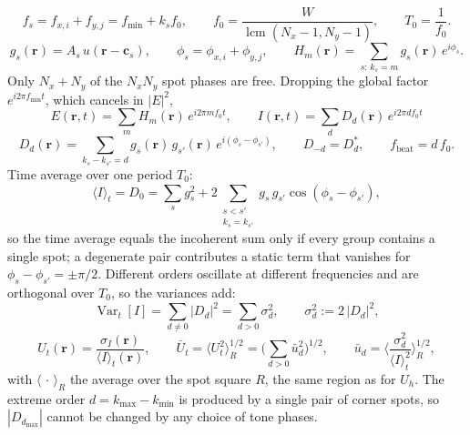 \begin{equation}
f_s=f_{x,i}+f_{y,j}=f_{\min}+k_sf_0,
\qquad
f_0=\frac{W}{\operatorname{lcm}(N_x-1,N_y-1)},
\qquad
T_0=\frac{1}{f_0} .
\end{equation}
\begin{equation}
g_s(\mathbf{r})=A_s\,u(\mathbf{r}-\mathbf{c}_s),
\qquad
\phi_s=\phi_{x,i}+\phi_{y,j},
\qquad
H_m(\mathbf{r})=\sum_{s:\,k_s=m}g_s(\mathbf{r})\,e^{i\phi_s} .
\end{equation}
Only $N_x+N_y$ of the $N_xN_y$ spot phases are free. Dropping the global factor
$e^{i2\pi f_{\min}t}$, which cancels in $|E|^2$,
\begin{equation}
\boxed{\;
E(\mathbf{r},t)=\sum_m H_m(\mathbf{r})\,e^{i2\pi mf_0t},
\qquad
I(\mathbf{r},t)=\sum_d D_d(\mathbf{r})\,e^{i2\pi df_0t}\;}
\label{eq:app_fourier}
\end{equation}
\begin{equation}
D_d(\mathbf{r})=\!\!\sum_{k_s-k_{s'}=d}\!\!
g_s(\mathbf{r})\,g_{s'}(\mathbf{r})\,e^{i(\phi_s-\phi_{s'})},
\qquad
D_{-d}=D_d^{*},
\qquad
f_\mathrm{beat}=d\,f_0 .
\end{equation}
Time average over one period $T_0$:
\begin{equation}
\langle I\rangle_t=D_0
=\sum_s g_s^2
+2\!\!\sum_{\substack{s<s'\\ k_s=k_{s'}}}\!\! g_s\,g_{s'}\cos(\phi_s-\phi_{s'}),
\label{eq:app_timeavg}
\end{equation}
so the time average equals the incoherent sum only if every group contains a
single spot; a degenerate pair contributes a static term that vanishes for
$\phi_s-\phi_{s'}=\pm\pi/2$. Different orders oscillate at different
frequencies and are orthogonal over $T_0$, so the variances add:
\begin{equation}
\operatorname{Var}_t[I]=\sum_{d\neq0}|D_d|^2
=\sum_{d>0}\sigma_d^2,
\qquad
\sigma_d^2:=2\,|D_d|^2 ,
\label{eq:app_parseval}
\end{equation}
\begin{equation}
U_t(\mathbf{r})=\frac{\sigma_I(\mathbf{r})}{\langle I\rangle_t(\mathbf{r})},
\qquad
\bar U_t=\big\langle U_t^2\big\rangle_R^{1/2}
=\Big(\sum_{d>0}\bar u_d^2\Big)^{1/2},
\qquad
\bar u_d=\bigg\langle\frac{\sigma_d^2}{\langle I\rangle_t^2}\bigg\rangle_R^{1/2},
\label{eq:app_Ut}
\end{equation}
with $\langle\,\cdot\,\rangle_R$ the average over the spot square $R$, the same
region as for $U_h$. The extreme order $d=k_{\max}-k_{\min}$ is produced by a
single pair of corner spots, so $|D_{d_{\max}}|$ cannot be changed by any
choice of tone phases.

